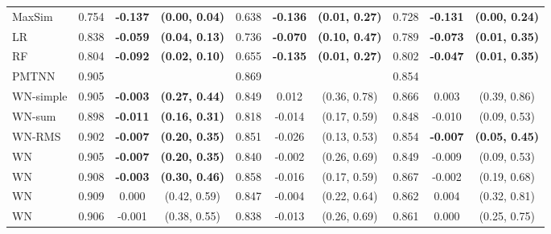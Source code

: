 {\begin{landscape}
\begin{table}[htb]
\begin{tabular}{ l S S c S S c S S c }
            {} \\
    \midrule
    MaxSim & 0.754 & \bfseries \color{red} -0.137 & \bfseries \color{red} (\num{0.00}, \num{0.04}) & 0.638 & \bfseries \color{red} -0.136 & \bfseries \color{red} (\num{0.01}, \num{0.27}) & 0.728 & \bfseries \color{red} -0.131 & \bfseries \color{red} (\num{0.00}, \num{0.24}) \\
    LR & 0.838 & \bfseries \color{red} -0.059 & \bfseries \color{red} (\num{0.04}, \num{0.13}) & 0.736 & \bfseries \color{red} -0.070 & \bfseries \color{red} (\num{0.10}, \num{0.47}) & 0.789 & \bfseries \color{red} -0.073 & \bfseries \color{red} (\num{0.01}, \num{0.35}) \\
    RF & 0.804 & \bfseries \color{red} -0.092 & \bfseries \color{red} (\num{0.02}, \num{0.10}) & 0.655 & \bfseries \color{red} -0.135 & \bfseries \color{red} (\num{0.01}, \num{0.27}) & 0.802 & \bfseries \color{red} -0.047 & \bfseries \color{red} (\num{0.01}, \num{0.35}) \\
    PMTNN & 0.905 &  &  & 0.869 &  &  & 0.854 &  &  \\
    \midrule
    WN-simple & 0.905 & \bfseries \color{red} -0.003 & \bfseries \color{red} (\num{0.27}, \num{0.44}) & 0.849 & 0.012 & (\num{0.36}, \num{0.78}) & 0.866 & 0.003 & (\num{0.39}, \num{0.86}) \\
    WN-sum & 0.898 & \bfseries \color{red} -0.011 & \bfseries \color{red} (\num{0.16}, \num{0.31}) & 0.818 & -0.014 & (\num{0.17}, \num{0.59}) & 0.848 & -0.010 & (\num{0.09}, \num{0.53}) \\
    WN-RMS & 0.902 & \bfseries \color{red} -0.007 & \bfseries \color{red} (\num{0.20}, \num{0.35}) & 0.851 & -0.026 & (\num{0.13}, \num{0.53}) & 0.854 & \bfseries \color{red} -0.007 & \bfseries \color{red} (\num{0.05}, \num{0.45}) \\
    WN & 0.905 & \bfseries \color{red} -0.007 & \bfseries \color{red} (\num{0.20}, \num{0.35}) & 0.840 & -0.002 & (\num{0.26}, \num{0.69}) & 0.849 & -0.009 & (\num{0.09}, \num{0.53}) \\
    WN & 0.908 & \bfseries \color{red} -0.003 & \bfseries \color{red} (\num{0.30}, \num{0.46}) & 0.858 & -0.016 & (\num{0.17}, \num{0.59}) & 0.867 & -0.002 & (\num{0.19}, \num{0.68}) \\
    WN & 0.909 & 0.000 & (\num{0.42}, \num{0.59}) & 0.847 & -0.004 & (\num{0.22}, \num{0.64}) & 0.862 & 0.004 & (\num{0.32}, \num{0.81}) \\
    WN & 0.906 & -0.001 & (\num{0.38}, \num{0.55}) & 0.838 & -0.013 & (\num{0.26}, \num{0.69}) & 0.861 & 0.000 & (\num{0.25}, \num{0.75}) \\

\end{tabular}
\end{table}
\end{landscape}}

